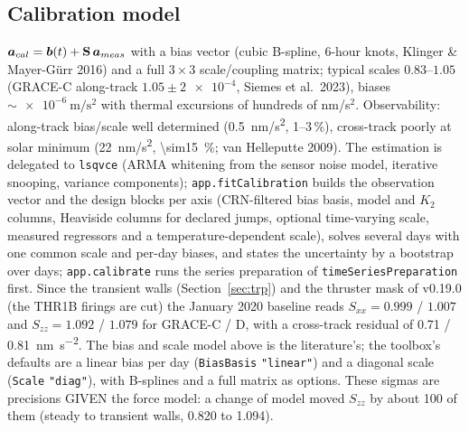 \subsection{Calibration model}
$\bm{a}_{cal}=\bm{b}(t)+\mathbf S\,\bm{a}_{meas}$ with a bias vector (cubic B-spline, 6-hour knots, Klinger \& Mayer-Gürr 2016) and a full $3\times3$ scale/coupling matrix; typical scales $0.83$--$1.05$ (GRACE-C along-track $1.05\pm\num{2e-4}$, Siemes et al.\ 2023), biases $\sim\SI{e-6}{\metre\per\second\squared}$ with thermal excursions of hundreds of nm/s$^2$. Observability: along-track bias/scale well determined (\SI{0.5}{nm/s^2}, 1--3\,\%), cross-track poorly at solar minimum (\SI{22}{nm/s^2}, \SI{\sim15}{\percent}; van Helleputte 2009). The estimation is delegated to \texttt{lsqvce} (ARMA whitening from the sensor noise model, iterative snooping, variance components); \texttt{app.fitCalibration} builds the observation vector and the design blocks per axis (CRN-filtered bias basis, model and $K_2$ columns, Heaviside columns for declared jumps, optional time-varying scale, measured regressors and a temperature-dependent scale), solves several days with one common scale and per-day biases, and states the uncertainty by a bootstrap over days; \texttt{app.calibrate} runs the series preparation of \texttt{timeSeriesPreparation} first. Since the transient walls (Section~\ref{sec:trp}) and the thruster mask of v0.19.0 (the THR1B firings are cut) the January 2020 baseline reads $S_{xx}=0.999$ / $1.007$ and $S_{zz}=1.092$ / $1.079$ for GRACE-C / D, with a cross-track residual of 0.71 / \SI{0.81}{\nano\metre\per\second\squared}. The bias and scale model above is the literature's; the toolbox's defaults are a linear bias per day (\texttt{BiasBasis} \texttt{"linear"}) and a diagonal scale (\texttt{Scale} \texttt{"diag"}), with B-splines and a full matrix as options. These sigmas are precisions GIVEN the force model: a change of model moved $S_{zz}$ by about 100 of them (steady to transient walls, 0.820 to 1.094).

